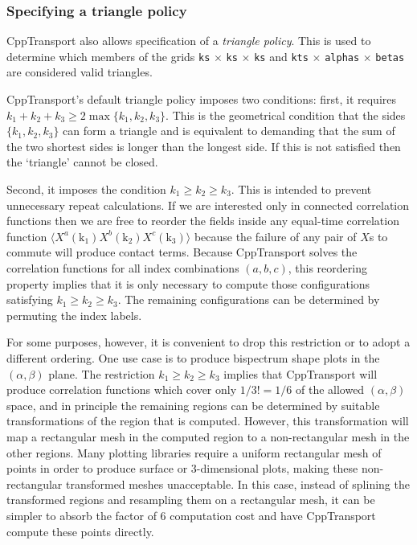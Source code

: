 \documentclass[11pt,a4paper]{article}
\newcommand{\vect}[1]{\bm{\mathrm{{#1}}}}
\newcommand{\packagefont}{\sffamily}
\newcommand{\CppTransport}{{\packagefont CppTransport}}
\renewcommand{\geq}{\geqslant}
\begin{document}
\subsubsection{Specifying a triangle policy}
\label{sec:triangle-policy}
{\CppTransport} also allows specification of a \emph{triangle policy}.
This is used to determine which members of the grids
\texttt{ks} $\times$ \texttt{ks} $\times$ \texttt{ks}
and
\texttt{kts} $\times$ \texttt{alphas} $\times$ \texttt{betas}
are considered valid triangles.

{\CppTransport}'s default triangle policy imposes two conditions: first,
it requires $k_1 + k_2 + k_3 \geq 2 \max \{ k_1, k_2, k_3 \}$.
This is the geometrical condition that the sides
$\{ k_1, k_2, k_3 \}$ can form a triangle
and is equivalent to demanding that the sum of the two shortest sides is longer than the
longest side.
If this is not satisfied then the `triangle' cannot be closed.

Second, it imposes the condition
$k_1 \geq k_2 \geq k_3$.
This is intended to prevent unnecessary repeat calculations.
If we are interested only in connected correlation functions
then we are free to reorder the fields inside any
equal-time
correlation function
$\langle X^a(\vect{k}_1) X^b(\vect{k}_2) X^c(\vect{k}_3) \rangle$
because the failure of any pair of $X$s to commute will produce
contact terms.
Because {\CppTransport} solves the correlation functions for
all index combinations $(a,b,c)$, this reordering property
implies that it is only necessary to compute those configurations
satisfying $k_1 \geq k_2 \geq k_3$.
The remaining configurations can be determined by
permuting the index labels.

For some purposes, however, it is convenient to drop this restriction
or to adopt a different ordering. One use case is to produce
bispectrum shape plots in the $(\alpha, \beta)$ plane.
The restriction $k_1 \geq k_2 \geq k_3$ implies that
{\CppTransport} will produce correlation functions which cover only
$1/3! = 1/6$ of the allowed $(\alpha, \beta)$ space,
and in principle the remaining
regions can be determined by suitable transformations
of the region that is computed.
However, this transformation will map a rectangular mesh
in the computed region
to a non-rectangular mesh in the other regions.
Many plotting libraries require a uniform rectangular mesh
of points in order to produce surface or 3-dimensional plots,
making these non-rectangular transformed meshes unacceptable.
In this case, instead of splining the transformed regions and resampling
them on a rectangular mesh, it can be simpler
to absorb the factor of 6 computation cost and have
{\CppTransport} compute these points directly.
\end{document}
